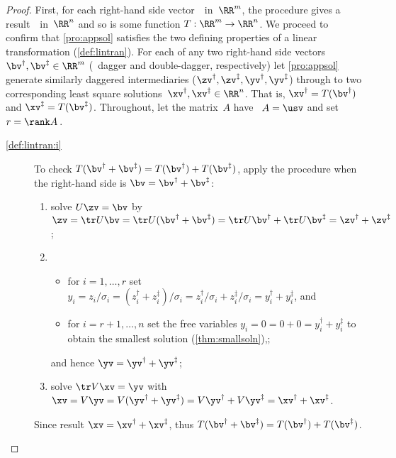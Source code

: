 \begin{proof} 
First, for each right-hand side vector~\bv\ in~\(\RR^m\), the procedure gives a result~\xv\ in~\(\RR^n\) and so is some function \(T:\RR^m\to\RR^n\).
We proceed to confirm that \cref{pro:appsol} satisfies the two defining properties of a linear transformation (\cref{def:lintran}).
For each of any two right-hand side vectors \(\bv^\dag,\bv^\ddag\in\RR^m\) (\bv\ dagger and double-dagger, respectively) let \cref{pro:appsol} generate similarly daggered intermediaries (\(\zv^\dag,\zv^\ddag,\yv^\dag,\yv^\ddag\)) through to two corresponding least square solutions~\(\xv^\dag,\xv^\ddag\in\RR^n\).
That is, \(\xv^\dag=T(\bv^\dag)\) and \(\xv^\ddag=T(\bv^\ddag)\).
Throughout, let the matrix~\(A\) have \svd\ \(A=\usv\) and set \(r=\rank A\)\,.
\begin{description}
\item[\ref{def:lintran:i}]  
To check \(T(\bv^\dag+\bv^\ddag)=T(\bv^\dag)+T(\bv^\ddag)\), apply the procedure when the right-hand side is \(\bv=\bv^\dag+\bv^\ddag\):
\begin{enumerate}
\item solve \(U\zv=\bv\) by \(\zv=\tr U\bv=\tr U(\bv^\dag+\bv^\ddag)=\tr U\bv^\dag+\tr U\bv^\ddag=\zv^\dag+\zv^\ddag\);
\item \begin{itemize}
\item for \(i=1,\ldots,r\) set \(y_i=z_i/\sigma_i=(z^\dag_i+z^\ddag_i)/\sigma_i=z^\dag_i/\sigma_i+z^\ddag_i/\sigma_i=y^\dag_i+y^\ddag_i\), and
\item for \(i=r+1,\ldots,n\) set the free variables \(y_i=0=0+0=y^\dag_i+y^\ddag_i\) to obtain the smallest solution (\cref{thm:smallsoln}),;
\end{itemize}
and hence \(\yv=\yv^\dag+\yv^\ddag\);
\item solve \(\tr V\xv=\yv\) with \(\xv=V\yv=V(\yv^\dag+\yv^\ddag)=V\yv^\dag+V\yv^\ddag=\xv^\dag+\xv^\ddag\).
\end{enumerate}
Since result \(\xv=\xv^\dag+\xv^\ddag\), thus \(T(\bv^\dag+\bv^\ddag)=T(\bv^\dag)+T(\bv^\ddag)\).


\end{description}
\end{proof}
